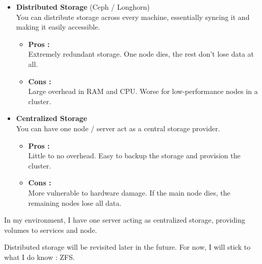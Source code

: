 \begin{itemize}
	\item \textbf{Distributed Storage} (Ceph / Longhorn) \\
	You can distribute storage across every machine, essentially syncing it and making it easily accessible. \\
	
	\begin{itemize}
		\item \textbf{Pros :} \\
		Extremely redundant storage. One node dies, the rest don't lose data at all.
		\item \textbf{Cons :} \\
		Large overhead in RAM and CPU. Worse for low-performance nodes in a cluster.
	\end{itemize}
	
	\item \textbf{Centralized Storage} \\
	You can have one node / server act as a central storage provider.
	
	\begin{itemize}
		\item \textbf{Pros :} \\
		Little to no overhead. Easy to backup the storage and provision the cluster.
		\item \textbf{Cons :} \\
		More vulnerable to hardware damage. If the main node dies, the remaining nodes lose all data. 
	\end{itemize}
\end{itemize}

In my environment, I have one server acting as centralized storage, providing volumes to services and node. 

Distributed storage will be revisited later in the future. For now, I will stick to what I do know : ZFS.